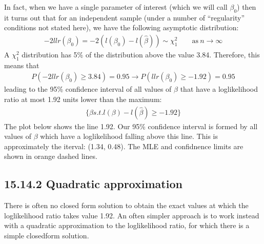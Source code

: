 \documentclass[letterpaper,10pt,english]{jupyterBook}
\begin{document}
\sphinxAtStartPar
In fact, when we have a single parameter of interest (which we will call \(\beta_0\)) then it turns out that for an independent sample (under a number of “regularity” conditions not stated here), we have the following asymptotic distribution:
\begin{equation*}
\begin{split}
-2 llr(\beta_0) = -2 (l(\beta_0) - l(\hat{\beta})) \sim \chi^2_1    \qquad \text{as} \ n \rightarrow \infty
\end{split}
\end{equation*}
\sphinxAtStartPar
A \(\chi^2_1\) distribution has 5\% of the distribution above the value 3.84. Therefore, this means that
\begin{equation*}
\begin{split}
P(-2 llr(\beta_0) \geq 3.84) = 0.95 \rightarrow P(llr(\beta_0) \geq  -1.92) = 0.95
\end{split}
\end{equation*}
\sphinxAtStartPar
leading to the 95\% confidence interval of all values of \(\beta\) that have a log\sphinxhyphen{}likelihood ratio at most 1.92 units lower than the maximum:
\begin{equation*}
\begin{split}
\{ \beta s.t. l(\beta) - l(\hat{\beta}) \geq -1.92\}
\end{split}
\end{equation*}
\sphinxAtStartPar
The plot below shows the line \sphinxhyphen{}1.92. Our 95\% confidence interval is formed by all values of \(\beta\) which have a log\sphinxhyphen{}likelihood falling above this line. This is approximately the iterval: (\sphinxhyphen{}1.34, 0.48). The MLE and confidnence limits are shown in orange dashed lines.

\noindent{}


\subsection{15.14.2 Quadratic approximation}
\label{\detokenize{15.m. Logistic Regression:quadratic-approximation}}
\sphinxAtStartPar
There is often no closed form solution to obtain the exact values at which the log\sphinxhyphen{}likelihood ratio takes value \sphinxhyphen{}1.92. An often simpler approach is to work instead with a quadratic approximation to the log\sphinxhyphen{}likelihood ratio, for which there is a simple closed\sphinxhyphen{}form solution.
\end{document}
